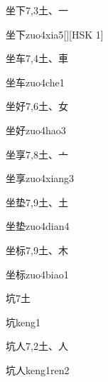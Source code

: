 \begin{entry}{坐下}{7,3}{⼟、⼀}
  \begin{phonetics}{坐下}{zuo4xia5}[][HSK 1]
  \end{phonetics}
\end{entry}

\begin{entry}{坐车}{7,4}{⼟、⾞}
  \begin{phonetics}{坐车}{zuo4che1}
  \end{phonetics}
\end{entry}

\begin{entry}{坐好}{7,6}{⼟、⼥}
  \begin{phonetics}{坐好}{zuo4hao3}
  \end{phonetics}
\end{entry}

\begin{entry}{坐享}{7,8}{⼟、⼇}
  \begin{phonetics}{坐享}{zuo4xiang3}
  \end{phonetics}
\end{entry}

\begin{entry}{坐垫}{7,9}{⼟、⼟}
  \begin{phonetics}{坐垫}{zuo4dian4}
  \end{phonetics}
\end{entry}

\begin{entry}{坐标}{7,9}{⼟、⽊}
  \begin{phonetics}{坐标}{zuo4biao1}
  \end{phonetics}
\end{entry}

\begin{entry}{坑}{7}{⼟}
  \begin{phonetics}{坑}{keng1}
  \end{phonetics}
\end{entry}

\begin{entry}{坑人}{7,2}{⼟、⼈}
  \begin{phonetics}{坑人}{keng1ren2}
  \end{phonetics}
\end{entry}

